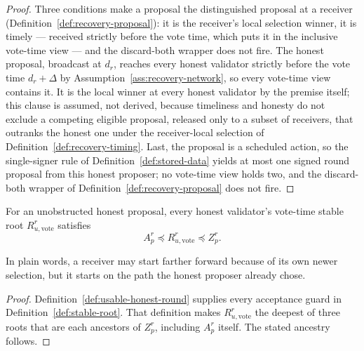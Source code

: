\begin{proof}
Three conditions make a proposal the distinguished proposal at a
receiver (Definition~\ref{def:recovery-proposal}): it is the
receiver's local selection winner, it is timely --- received strictly
before the vote time, which puts it in the inclusive vote-time view ---
and the discard-both wrapper does not fire.  The honest proposal,
broadcast at \(d_r\), reaches every honest validator strictly before
the vote time \(d_r+\Delta\) by
Assumption~\ref{ass:recovery-network}, so every vote-time view contains
it.  It is the local winner at every honest validator by the premise
itself; this clause is assumed, not derived, because timeliness and
honesty do not exclude a competing eligible proposal, released only to a
subset of receivers, that outranks the honest one under the
receiver-local selection of Definition~\ref{def:recovery-timing}.
Last, the proposal is a scheduled action, so the single-signer rule of
Definition~\ref{def:stored-data} yields at most one signed round
proposal from this honest proposer; no vote-time view holds two, and the
discard-both wrapper of Definition~\ref{def:recovery-proposal} does not
fire.
\end{proof}

\begin{lemma}
\label{lem:honest-proposer-stable-root}
For an unobstructed honest proposal, every honest validator's vote-time
stable root \(R_{u,\mathrm{vote}}^r\) satisfies
\[
 A_p^r\preceq R_{u,\mathrm{vote}}^r\preceq Z_p^r.
\]

In plain words, a receiver may start farther forward because of its own
newer selection, but it starts on the path the honest proposer already
chose.
\end{lemma}

\begin{proof}
Definition~\ref{def:usable-honest-round} supplies every acceptance guard in
Definition~\ref{def:stable-root}.  That definition makes
\(R_{u,\mathrm{vote}}^r\) the deepest of three roots that are each ancestors
of \(Z_p^r\), including \(A_p^r\) itself.  The stated ancestry follows.
\end{proof}

